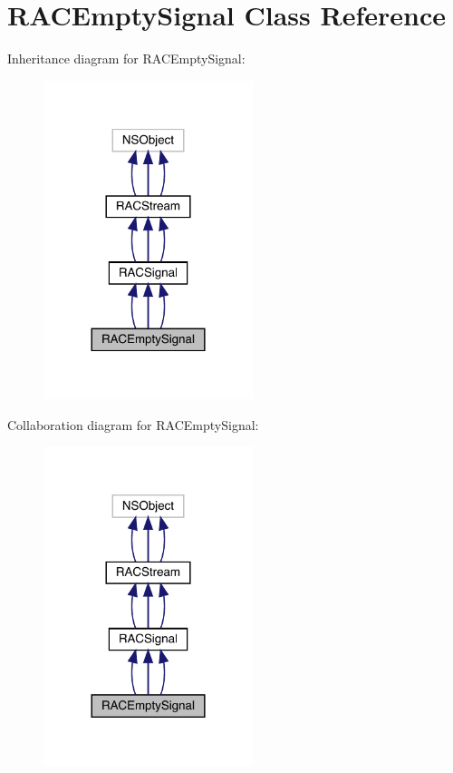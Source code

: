 \hypertarget{interface_r_a_c_empty_signal}{}\section{R\+A\+C\+Empty\+Signal Class Reference}
\label{interface_r_a_c_empty_signal}


Inheritance diagram for R\+A\+C\+Empty\+Signal\+:\nopagebreak
\begin{figure}[H]
\begin{center}
\leavevmode
\includegraphics[width=173pt]{interface_r_a_c_empty_signal__inherit__graph}
\end{center}
\end{figure}


Collaboration diagram for R\+A\+C\+Empty\+Signal\+:\nopagebreak
\begin{figure}[H]
\begin{center}
\leavevmode
\includegraphics[width=173pt]{interface_r_a_c_empty_signal__coll__graph}
\end{center}
\end{figure}
